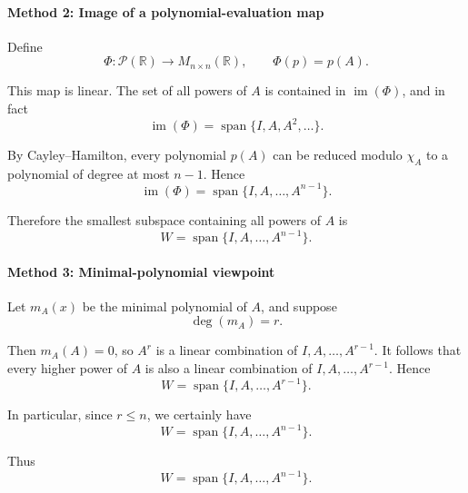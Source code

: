 \documentclass[12pt]{article}
\newcommand{\Span}{\operatorname{span}}
\begin{document}
\paragraph{Method 2: Image of a polynomial-evaluation map}

Define
\[
\Phi:\mathcal P(\mathbb R)\to M_{n\times n}(\mathbb R),\qquad \Phi(p)=p(A).
\]

This map is linear. The set of all powers of \(A\) is contained in \(\operatorname{im}(\Phi)\), and in fact
\[
\operatorname{im}(\Phi)=\Span\{I,A,A^2,\dots\}.
\]

By Cayley--Hamilton, every polynomial \(p(A)\) can be reduced modulo \(\chi_A\) to a polynomial of degree at most \(n-1\). Hence
\[
\operatorname{im}(\Phi)=\Span\{I,A,\dots,A^{n-1}\}.
\]

Therefore the smallest subspace containing all powers of \(A\) is
\[
\boxed{W=\Span\{I,A,\dots,A^{n-1}\}}.
\]

\paragraph{Method 3: Minimal-polynomial viewpoint}

Let \(m_A(x)\) be the minimal polynomial of \(A\), and suppose
\[
\deg(m_A)=r.
\]

Then \(m_A(A)=0\), so \(A^r\) is a linear combination of \(I,A,\dots,A^{r-1}\). It follows that every higher power of \(A\) is also a linear combination of \(I,A,\dots,A^{r-1}\). Hence
\[
W=\Span\{I,A,\dots,A^{r-1}\}.
\]

In particular, since \(r\le n\), we certainly have
\[
W=\Span\{I,A,\dots,A^{n-1}\}.
\]

Thus
\[
\boxed{W=\Span\{I,A,\dots,A^{n-1}\}}.
\]
\end{document}
